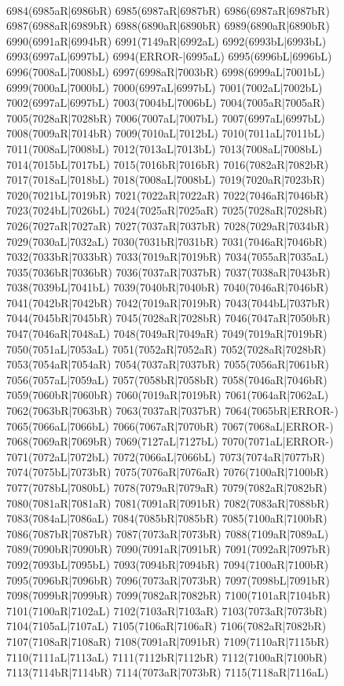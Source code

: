\\6984(6985aR|6986bR) 6985(6987aR|6987bR) 6986(6987aR|6987bR) 6987(6988aR|6989bR) 6988(6890aR|6890bR) 6989(6890aR|6890bR) 6990(6991aR|6994bR) 6991(7149aR|6992aL) 6992(6993bL|6993bL) \\6993(6997aL|6997bL) 6994(ERROR-|6995aL) 6995(6996bL|6996bL) 6996(7008aL|7008bL) 6997(6998aR|7003bR) 6998(6999aL|7001bL) 6999(7000aL|7000bL) 7000(6997aL|6997bL) 7001(7002aL|7002bL) \\7002(6997aL|6997bL) 7003(7004bL|7006bL) 7004(7005aR|7005aR) 7005(7028aR|7028bR) 7006(7007aL|7007bL) 7007(6997aL|6997bL) 7008(7009aR|7014bR) 7009(7010aL|7012bL) 7010(7011aL|7011bL) \\7011(7008aL|7008bL) 7012(7013aL|7013bL) 7013(7008aL|7008bL) 7014(7015bL|7017bL) 7015(7016bR|7016bR) 7016(7082aR|7082bR) 7017(7018aL|7018bL) 7018(7008aL|7008bL) 7019(7020aR|7023bR) \\7020(7021bL|7019bR) 7021(7022aR|7022aR) 7022(7046aR|7046bR) 7023(7024bL|7026bL) 7024(7025aR|7025aR) 7025(7028aR|7028bR) 7026(7027aR|7027aR) 7027(7037aR|7037bR) 7028(7029aR|7034bR) \\7029(7030aL|7032aL) 7030(7031bR|7031bR) 7031(7046aR|7046bR) 7032(7033bR|7033bR) 7033(7019aR|7019bR) 7034(7055aR|7035aL) 7035(7036bR|7036bR) 7036(7037aR|7037bR) 7037(7038aR|7043bR) \\7038(7039bL|7041bL) 7039(7040bR|7040bR) 7040(7046aR|7046bR) 7041(7042bR|7042bR) 7042(7019aR|7019bR) 7043(7044bL|7037bR) 7044(7045bR|7045bR) 7045(7028aR|7028bR) 7046(7047aR|7050bR) \\7047(7046aR|7048aL) 7048(7049aR|7049aR) 7049(7019aR|7019bR) 7050(7051aL|7053aL) 7051(7052aR|7052aR) 7052(7028aR|7028bR) 7053(7054aR|7054aR) 7054(7037aR|7037bR) 7055(7056aR|7061bR) \\7056(7057aL|7059aL) 7057(7058bR|7058bR) 7058(7046aR|7046bR) 7059(7060bR|7060bR) 7060(7019aR|7019bR) 7061(7064aR|7062aL) 7062(7063bR|7063bR) 7063(7037aR|7037bR) 7064(7065bR|ERROR-) \\7065(7066aL|7066bL) 7066(7067aR|7070bR) 7067(7068aL|ERROR-) 7068(7069aR|7069bR) 7069(7127aL|7127bL) 7070(7071aL|ERROR-) 7071(7072aL|7072bL) 7072(7066aL|7066bL) 7073(7074aR|7077bR) \\7074(7075bL|7073bR) 7075(7076aR|7076aR) 7076(7100aR|7100bR) 7077(7078bL|7080bL) 7078(7079aR|7079aR) 7079(7082aR|7082bR) 7080(7081aR|7081aR) 7081(7091aR|7091bR) 7082(7083aR|7088bR) \\7083(7084aL|7086aL) 7084(7085bR|7085bR) 7085(7100aR|7100bR) 7086(7087bR|7087bR) 7087(7073aR|7073bR) 7088(7109aR|7089aL) 7089(7090bR|7090bR) 7090(7091aR|7091bR) 7091(7092aR|7097bR) \\7092(7093bL|7095bL) 7093(7094bR|7094bR) 7094(7100aR|7100bR) 7095(7096bR|7096bR) 7096(7073aR|7073bR) 7097(7098bL|7091bR) 7098(7099bR|7099bR) 7099(7082aR|7082bR) 7100(7101aR|7104bR) \\7101(7100aR|7102aL) 7102(7103aR|7103aR) 7103(7073aR|7073bR) 7104(7105aL|7107aL) 7105(7106aR|7106aR) 7106(7082aR|7082bR) 7107(7108aR|7108aR) 7108(7091aR|7091bR) 7109(7110aR|7115bR) \\7110(7111aL|7113aL) 7111(7112bR|7112bR) 7112(7100aR|7100bR) 7113(7114bR|7114bR) 7114(7073aR|7073bR) 7115(7118aR|7116aL) 